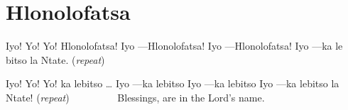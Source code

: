 \starttocol
\chapter{Hlonolofatsa}
\nexttocol
\hfill{\it }
\stoptocol
\starttocol
\startlines
I{\sc yo}! Yo! Yo! Hlonolofatsa!
Iyo ---Hlonolofatsa!
Iyo ---Hlonolofatsa!
Iyo ---ka le bitso la Ntate.
          \hfill({\it repeat})~~~~~~~~~

Iyo! Yo! Yo!  ka lebitso \dots
Iyo ---ka lebitso
Iyo ---ka lebitso
Iyo ---ka lebitso la Ntate!
          \hfill({\it repeat})~~~~~~~~~
\stoplines
\nexttocol
Blessings, are in the Lord's name.
\stoptocol
